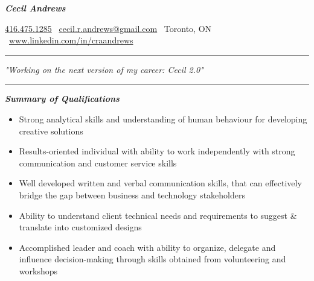 \documentclass{article}
\begin{document}
\begin{center}
   
\Huge \textcolor{ablue}{\textit{\textbf{Cecil Andrews}}}

\end{center}

\begin{center}
 
    \href{tel:+1 416.475.1285}{416.475.1285} \textbar  \ \href{mailto:cecil.r.andrews@gmail.com}{cecil.r.andrews@gmail.com}  \textbar  \ Toronto, ON  \textbar  \  \href{http://www.linkedin.com/in/craandrews}{www.linkedin.com/in/craandrews}

\end{center}


\noindent
{\color{ablue} \rule{\linewidth}{0.5mm} }
\begin{center}
\textcolor{ablue}{\LARGE \textit{"Working on the next version of my career: Cecil 2.0"}}
\end{center}
\noindent
{\color{ablue} \rule{\linewidth}{0.5mm} }

\begin{center}
\large \textcolor{ablue}{\textit{\textbf{Summary of Qualifications}}}
\end{center}

\begin{flushleft}
\begin{itemize}
\item Strong analytical skills and understanding of human behaviour for developing creative solutions\\
\item Results-oriented individual with ability to work independently with strong communication and customer service skills \\
\item Well developed written and verbal communication skills, that can effectively bridge the gap between business and technology stakeholders \\
\item Ability to understand client technical needs and requirements to suggest \& translate into customized designs\\
\item Accomplished leader and  coach with ability to organize, delegate and influence decision-making through skills obtained from volunteering and workshops
\end{itemize}
\end{flushleft}
\end{document}
